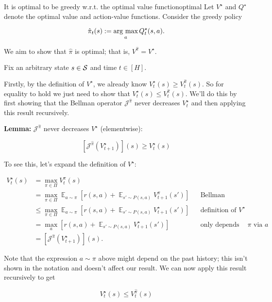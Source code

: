 \documentclass[../main/main]{subfiles}
\begin{document}
\begin{theorem}{It is optimal to be greedy w.r.t. the optimal value function}{optimal}
    Let $V^{\star}$ and $Q^{\star}$ denote the optimal value and action-value functions. Consider the greedy policy

    \[
        \hat \pi_t(s) := \argmax_a Q_t^{\star}(s, a).
    \]

    We aim to show that $\hat \pi$ is optimal; that is, $V^{\hat \pi} = V^{\star}$.

    Fix an arbitrary state $s \in \S$ and time $t \in [H]$.

    Firstly, by the definition of $V^{\star}$, we already know $V_t^{\star}(s) \ge V_t^{\hat \pi}(s)$. So for equality to hold we just need to show that $V_t^{\star}(s) \le V_t^{\hat \pi}(s)$. We'll do this by first showing that the Bellman operator $\mathcal{J}^{\hat \pi}$ never decreases $V_t^{\star}$ and then applying this result recursively.
    
    \textbf{Lemma:} $\mathcal{J}^{\hat \pi}$ never decreases $V^{\star}$ (elementwise):
    
    $$
    [\mathcal{J}^{\hat \pi} (V_{t+1}^{\star})](s) \ge V_t^{\star}(s)
    $$
    
    To see this, let's expand the definition of $V^{\star}$:
    
    \begin{align*}
    V_t^{\star}(s) &= \max_{\pi \in \Pi} V_t^{\pi}(s) \\
    &= \max_{\pi \in \Pi} \mathop{\mathbb{E}}_{a \sim \pi}\left[r(s, a) + \mathop{\mathbb{E}}_{s' \sim P(s, a)} V_{t+1}^\pi(s') \right] && \text{Bellman consistency} \\
    &\le \max_{\pi \in \Pi} \mathop{\mathbb{E}}_{a \sim \pi}\left[r(s, a) + \mathop{\mathbb{E}}_{s' \sim P(s, a)} V_{t+1}^{\star}(s') \right] && \text{definition of } V^\star \\
    &= \max_{a} \left[ r(s, a) + \mathop{\mathbb{E}}_{s' \sim P(s, a)} V_{t+1}^{\star}(s') \right] && \text{only depends on } \pi \text{ via } a \\
    &= [\mathcal{J}^{\hat \pi}(V_{t+1}^{\star})](s).
    \end{align*}
    
    Note that the expression $a \sim \pi$ above might depend on the past history; this isn't shown in the notation and doesn't affect our result. We can now apply this result recursively to get
    
    $$
    V^{\star}_t(s) \le V^{\hat \pi}_t(s)
    $$


\end{theorem}
\end{document}
